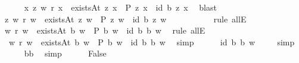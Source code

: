\begin{isabellebody}
\ \ \ \ \isamarkupfalse%
\ {\isachardoublequoteopen}{\isasymforall}x{\isachardot}\ {\isasymforall}z{\isachardot}\ {\isacharparenleft}w\ r\ x\ {\isasymand}\ existsAt\ z\ x\ {\isasymand}\ P\ z\ x{\isacharparenright}\ {\isasymlongrightarrow}\ {\isacharparenleft}\isactrlbold {\isasymrightharpoondown}{\isacharparenleft}id\ b{\isacharparenright}{\isacharparenright}\ z\ x{\isachardoublequoteclose}\ \isamarkupfalse%
\ blast\isanewline
\ \ \ \ \isamarkupfalse%
\ {\isachardoublequoteopen}{\isasymforall}z{\isachardot}\ {\isacharparenleft}w\ r\ w{}\ {\isasymand}\ existsAt\ z\ w{}\ {\isasymand}\ P\ z\ w{}{\isacharparenright}\ {\isasymlongrightarrow}\ {\isacharparenleft}\isactrlbold {\isasymrightharpoondown}{\isacharparenleft}id\ b{\isacharparenright}{\isacharparenright}\ z\ w{}{\isachardoublequoteclose}\ \isanewline
\ \ \ \ \ \ \ \ \isamarkupfalse%
\ {\isacharparenleft}rule\ allE{\isacharparenright}\isanewline
\ \ \ \ \isamarkupfalse%
\ {\isachardoublequoteopen}{\isacharparenleft}w\ r\ w{}\ {\isasymand}\ existsAt\ b\ w{}\ {\isasymand}\ P\ b\ w{}{\isacharparenright}\ {\isasymlongrightarrow}\ {\isacharparenleft}\isactrlbold {\isasymrightharpoondown}{\isacharparenleft}id\ b{\isacharparenright}{\isacharparenright}\ b\ w{}{\isachardoublequoteclose}\ \isamarkupfalse%
\ {\isacharparenleft}rule\ allE{\isacharparenright}\isanewline
\ \ \ \ \isamarkupfalse%
\ \ {\isachardoublequoteopen}{\isasymnot}{\isacharparenleft}w\ r\ w{}\ {\isasymand}\ existsAt\ b\ w{}\ {\isasymand}\ P\ b\ w{}{\isacharparenright}\ {\isasymor}\ {\isacharparenleft}\isactrlbold {\isasymrightharpoondown}{\isacharparenleft}id\ b{\isacharparenright}{\isacharparenright}\ b\ w{}{\isachardoublequoteclose}\ \isamarkupfalse%
\ simp\isanewline
\ \ \ \ \isamarkupfalse%
\ {\isachardoublequoteopen}{\isacharparenleft}\isactrlbold {\isasymrightharpoondown}{\isacharparenleft}id\ b{\isacharparenright}{\isacharparenright}\ b\ w{\isachardoublequoteclose}\ \isamarkupfalse%
\ {}\ \isamarkupfalse%
\ simp\isanewline
\ \ \ \ \isamarkupfalse%
\ {\isachardoublequoteopen}{\isasymnot}{\isacharparenleft}b{\isacharequal}b{\isacharparenright}{\isachardoublequoteclose}\ \isamarkupfalse%
\ simp\isanewline
\ \ \ \ \isamarkupfalse%
\ False\ \isamarkupfalse%

\end{isabellebody}

